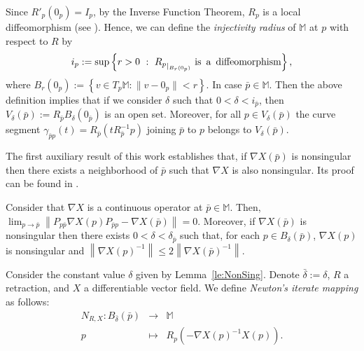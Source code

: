 \begin{remark}
Since $R'_{p}(0_{p})=I_{p}$, by the Inverse Function Theorem, $R_{p}$ is a local diffeomorphism (see \cite[Cap. 2, Sec. 2]{Sakai1996}). Hence, we can define the {\it injectivity radius} of $\mathbb{M}$ at $p$ with respect to $R$ by 
$$i_{p}:=\sup\left\{ r>0~:~{R_{p}}_{\lvert_{B_{r}(0_{p})}} \mbox{ is\, a\, diffeomorphism} \right\},$$
where $B_r(0_{p}):=\left\lbrace  v\in T_{p}\mathbb{M}:\parallel v-0_{p}\parallel <r\right\rbrace$. In case $\bar{p}\in \mathbb{M}$. Then the above definition implies  that if we consider $\delta$ such that $0<\delta<i_{\bar{p}}$, then $V_{\delta}( \bar p):=R_{\bar p}B_{\delta}(0_{ \bar p})$ is an open set. Moreover, for all $p\in V_{\delta}( \bar p)$  the  curve segment $\gamma_{\bar{p}p}(t)=R_{\bar{p}}\left(t R^{-1}_{\bar p}p\right)$ joining  $\bar p$ to $p$ belongs to $V_{\delta}( \bar p)$.
\end{remark}


\noindent The first auxiliary result of this work establishes that,  if $\nabla X(\bar{p})$ is nonsingular then there exists a neighborhood of $\bar{p}$ such that $\nabla X$ is also nonsingular. Its proof can be found in \cite[Lemma 3.2]{FernandesAndFerreiraAndYuan2017}.

\begin{lemma}\label{le:NonSing}
Consider that $\nabla X$ is a continuous operator at ${\bar p} \in \mathbb{M}$. Then, ${\lim_{p\to {\bar p}}}\left \| P_{p{\bar p}}\nabla X(p)P_{{\bar p}p}-\nabla X({\bar p}) \right \|=0.$ Moreover, if $\nabla X({\bar p})$ is  nonsingular then there exists  $0<\delta<\delta_{{\bar p}}$ such that, for each $p\in B_{\delta}({\bar p})$,   $\nabla X(p)$ is nonsingular and $\left \| \nabla X(p)^{-1}\right \|\leq 2\left \|\nabla X({\bar p})^{-1}\right \|$.
\end{lemma}
\noindent Consider the constant value $\delta$ given by Lemma~\ref{le:NonSing}. Denote $\bar{\delta}:=\delta$, $R$ a retraction, and $X$ a differentiable vector field. We define {\it Newton's iterate mapping} as follows:
\begin{eqnarray*}
N_{R,X}:B_{\bar{\delta}}(\bar{p}) &\to&  \mathbb{M}\\
p&\mapsto&R_{p}(-\nabla X(p)^{-1}X(p)).
\end{eqnarray*}


